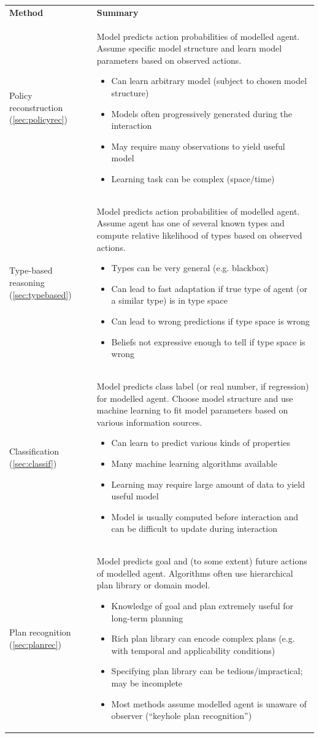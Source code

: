 \documentclass[final,1p,times,authoryear]{elsarticle}
\makeatletter
\newcommand{\nil}{@{}}
\newcommand{\proconlist}{\vspace{-3pt}\begin{itemize}[leftmargin=10pt,itemsep=-1pt]}
\newcommand{\itempro}{\renewcommand{\labelitemi}{$+$}\item}
\newcommand{\itemcon}{\renewcommand{\labelitemi}{$-$}\item}
\newcommand{\elist}{\end{itemize}}
\makeatother
\begin{document}
\begin{table}[h]
	\center
	\scriptsize
	\bgroup{}
	\begin{tabular}{\nil p{} \nil p{} \nil}
		\toprule
		\bf Method & \bf Summary \\[4pt]

		Policy reconstruction (\ref{sec:policyrec}) &
		Model predicts action probabilities of modelled agent. Assume specific model structure and learn model parameters based on observed actions.
		\proconlist
			\itempro Can learn arbitrary model (subject to chosen model structure)
			\itempro Models often progressively generated during the interaction
			\itemcon May require many observations to yield useful model
			\itemcon Learning task can be complex (space/time)
		\elist \\

		Type-based reasoning (\ref{sec:typebased}) &
		Model predicts action probabilities of modelled agent. Assume agent has one of several known types and compute relative likelihood of types based on observed actions.
		\proconlist
			\itempro Types can be very general (e.g. blackbox)
			\itempro Can lead to fast adaptation if true type of agent (or a similar type) is in type space
			\itemcon Can lead to wrong predictions if type space is wrong
			\itemcon Beliefs not expressive enough to tell if type space is wrong
		\elist \\

		Classification (\ref{sec:classif}) &
		Model predicts class label (or real number, if regression) for modelled agent. Choose model structure and use machine learning to fit model parameters based on various information sources.
		\proconlist
			\itempro Can learn to predict various kinds of properties
			\itempro Many machine learning algorithms available
			\itemcon Learning may require large amount of data to yield useful model
			\itemcon Model is usually computed before interaction and can be difficult to update during interaction
		\elist \\

		Plan recognition (\ref{sec:planrec}) &
		Model predicts goal and (to some extent) future actions of modelled agent. Algorithms often use hierarchical plan library or domain model.
		\proconlist
			\itempro Knowledge of goal and plan extremely useful for long-term planning
			\itempro Rich plan library can encode complex plans (e.g. with temporal and applicability conditions)
			\itemcon Specifying plan library can be tedious/impractical; may be incomplete
			\itemcon Most methods assume modelled agent is unaware of observer (``keyhole plan recognition'')
		\elist \\


\end{tabular}
\end{table}
\end{document}
